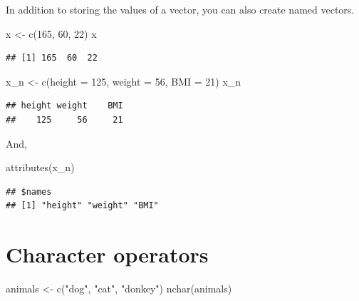 \documentclass[
]{book}
\newenvironment{Shaded}{\begin{snugshade}}{\end{snugshade}}
\newcommand{\AttributeTok}[1]{\textcolor[rgb]{0.77,0.63,0.00}{#1}}
\newcommand{\DecValTok}[1]{\textcolor[rgb]{0.00,0.00,0.81}{#1}}
\newcommand{\FunctionTok}[1]{\textcolor[rgb]{0.00,0.00,0.00}{#1}}
\newcommand{\NormalTok}[1]{#1}
\newcommand{\OtherTok}[1]{\textcolor[rgb]{0.56,0.35,0.01}{#1}}
\newcommand{\StringTok}[1]{\textcolor[rgb]{0.31,0.60,0.02}{#1}}
\theoremstyle{definition}
\theoremstyle{definition}
\theoremstyle{definition}
\theoremstyle{definition}
\theoremstyle{remark}
\begin{document}
In addition to storing the values of a vector, you can also create named vectors.

\begin{Shaded}
\begin{Highlighting}[]
\NormalTok{x }\OtherTok{\textless{}{-}} \FunctionTok{c}\NormalTok{(}\DecValTok{165}\NormalTok{, }\DecValTok{60}\NormalTok{, }\DecValTok{22}\NormalTok{)}
\NormalTok{x}
\end{Highlighting}
\end{Shaded}

\begin{verbatim}
## [1] 165  60  22
\end{verbatim}

\begin{Shaded}
\begin{Highlighting}[]
\NormalTok{x\_n }\OtherTok{\textless{}{-}} \FunctionTok{c}\NormalTok{(}\AttributeTok{height =} \DecValTok{125}\NormalTok{, }\AttributeTok{weight =} \DecValTok{56}\NormalTok{, }\AttributeTok{BMI =} \DecValTok{21}\NormalTok{)}
\NormalTok{x\_n}
\end{Highlighting}
\end{Shaded}

\begin{verbatim}
## height weight    BMI 
##    125     56     21
\end{verbatim}

And,

\begin{Shaded}
\begin{Highlighting}[]
\FunctionTok{attributes}\NormalTok{(x\_n)}
\end{Highlighting}
\end{Shaded}

\begin{verbatim}
## $names
## [1] "height" "weight" "BMI"
\end{verbatim}

\hypertarget{character-operators}{%
\section{Character operators}\label{character-operators}}

\begin{Shaded}
\begin{Highlighting}[]
\NormalTok{animals }\OtherTok{\textless{}{-}} \FunctionTok{c}\NormalTok{(}\StringTok{"dog"}\NormalTok{, }\StringTok{"cat"}\NormalTok{, }\StringTok{"donkey"}\NormalTok{)}
\FunctionTok{nchar}\NormalTok{(animals)}
\end{Highlighting}
\end{Shaded}
\end{document}
